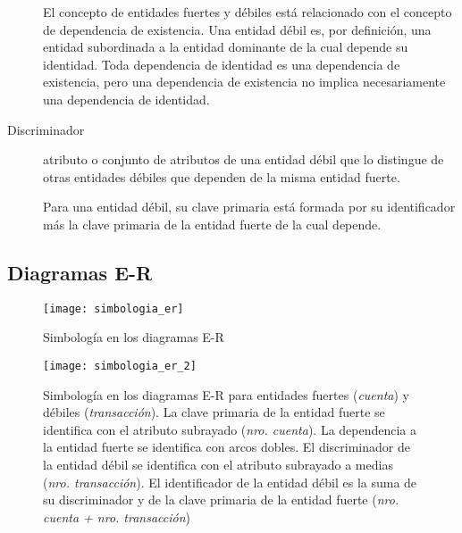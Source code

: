 \documentclass[a4paper, twoside]{article}
\begin{document}
\begin{description}
	El concepto de entidades fuertes y débiles está relacionado con el concepto de dependencia de existencia. Una entidad débil es, por definición, una entidad subordinada a la entidad dominante de la cual depende su identidad. Toda dependencia de identidad es una dependencia de existencia, pero una dependencia de existencia no implica necesariamente una dependencia de identidad.

	\item[Discriminador] atributo o conjunto de atributos de una entidad débil que lo distingue de otras entidades débiles que dependen de la misma entidad fuerte.
	
	Para una entidad débil, su clave primaria está formada por su identificador más la clave primaria de la entidad fuerte de la cual depende.
\end{description}

\subsection{Diagramas E-R}
\begin{figure}[H]
	\centering
	\texttt{[image: simbologia\_er]}
	\caption{Simbología en los diagramas E-R}
\end{figure}

\begin{figure}[H]
	\centering
	\texttt{[image: simbologia\_er\_2]}
	\caption{Simbología en los diagramas E-R para entidades fuertes (\emph{cuenta}) y débiles (\emph{transacción}). La clave primaria de la entidad fuerte se identifica con el atributo subrayado (\emph{nro. cuenta}). La dependencia a la entidad fuerte se identifica con arcos dobles. El discriminador de la entidad débil se identifica con el atributo subrayado a medias (\emph{nro. transacción}). El identificador de la entidad débil es la suma de su discriminador y de la clave primaria de la entidad fuerte (\emph{nro. cuenta + nro. transacción})}
\end{figure}
\end{document}

